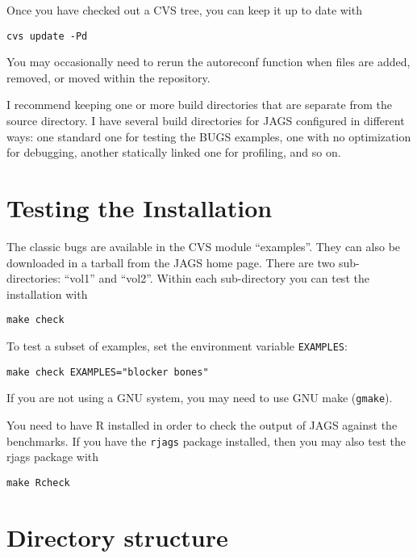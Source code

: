 \documentclass[11pt, a4paper, titlepage]{report}
\begin{document}
Once you have checked out a CVS tree, you can keep it up to date with
\begin{verbatim}
cvs update -Pd
\end{verbatim}
You may occasionally need to rerun the autoreconf function when files
are added, removed, or moved within the repository.

I recommend keeping one or more build directories that are separate
from the source directory. I have several build directories for JAGS
configured in different ways: one standard one for testing the BUGS
examples, one with no optimization for debugging, another statically
linked one for profiling, and so on.

\chapter{Testing the Installation}

The classic bugs are available in the CVS module ``examples''. They
can also be downloaded in a tarball from the JAGS home page. There are
two sub-directories: ``vol1'' and ``vol2''. Within each sub-directory
you can test the installation with
\begin{verbatim}
make check
\end{verbatim}
To test a subset of examples, set the environment variable \verb+EXAMPLES+:
\begin{verbatim}
make check EXAMPLES="blocker bones"
\end{verbatim}
If you are not using a GNU system, you may need to use GNU make
(\verb+gmake+).

You need to have R installed in order to check the output of JAGS
against the benchmarks.  If you have the \texttt{rjags} package
installed, then you may also test the rjags package with
\begin{verbatim}
make Rcheck
\end{verbatim}

\chapter{Directory structure}
\end{document}
